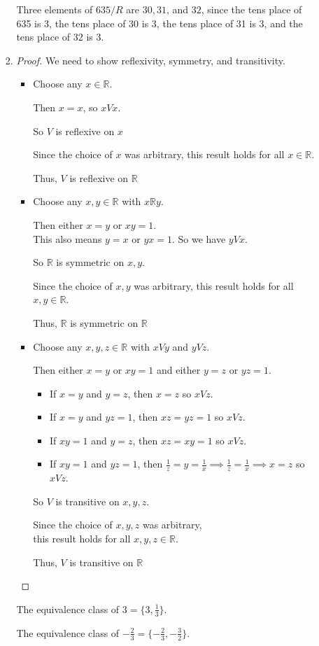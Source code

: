 \documentclass[12pt,letterpaper]{article}
\newcommand*\reflexive[4]{%
  Choose any $#3 \in #1$.

  #4

  So $#2$ is reflexive on $#3$

  Since the choice of $#3$ was arbitrary,
  this result holds for all $#3 \in #1$.

  Thus, $#2$ is reflexive on $#1$
}
\newcommand*\symmetric[5]{%
  Choose any $#3, #4 \in #1$ with $#3 #1 #4$.

  #5

  So $#1$ is symmetric on $#3, #4$.

  Since the choice of $#3, #4$ was arbitrary,
  this result holds for all $#3, #4 \in #1$.

  Thus, $#1$ is symmetric on $#1$
}
\newcommand*\transitive[6]{%
  Choose any $#3, #4, #5 \in #1$ with $#3 #2 #4$ and $#4 #2 #5$.

  #6

  So $#2$ is transitive on $#3, #4, #5$.

  Since the choice of $#3, #4, #5$ was arbitrary, \\
  this result holds for all $#3, #4, #5 \in #1$.

  Thus, $#2$ is transitive on $#1$
}
\newcommand*\equivrel[8]{%
  \begin{itemize}
    \item \reflexive{#1}{#2}{#3}{#6}
    \item \symmetric{#1}{#2}{#3}{#4}{#7}
    \item \transitive{#1}{#2}{#3}{#4}{#5}{#8}
  \end{itemize}
}
\begin{document}
\begin{enumerate}
\begin{enumerate}
\begin{enumerate}
              Three elements of $635 / R$ are $30, 31$, and $32$,
              since the tens place of 635 is 3, the tens place of 30 is 3, the tens place of 31 is 3, and the tens place of 32 is 3.
            \item
              \begin{proof}
                We need to show reflexivity, symmetry, and transitivity.

                \equivrel{\mathbb{R}}{V}{x}{y}{z}{
                  Then $x = x$, so $x V x$.
                }{
                  Then either $x = y$ or $x y = 1$. \\
                  This also means $y = x$ or $y x = 1$.
                  So we have $y V x$.
                }{
                  Then either $x = y$ or $xy = 1$ and either $y = z$ or $yz = 1$.
                  \begin{itemize}
                    \item If $x = y$ and $y = z$, then $x = z$ so $x V z$.
                    \item If $x = y$ and $yz = 1$, then $xz = yz = 1$ so $x V z$.
                    \item If $xy = 1$ and $y = z$, then $xz = xy = 1$ so $x V z$.
                    \item If $xy = 1$ and $yz = 1$, then $\frac{1}{z} = y = \frac{1}{x} \implies \frac{1}{z} = \frac{1}{x} \implies x = z$ so $x V z$.
                  \end{itemize}
                }
              \end{proof}

              The equivalence class of $3 = \{3, \frac{1}{3}\}$.

              The equivalence class of $-\frac{2}{3} = \{-\frac{2}{3}, -\frac{3}{2}\}$.


\end{enumerate}
\end{enumerate}
\end{enumerate}
\end{document}
